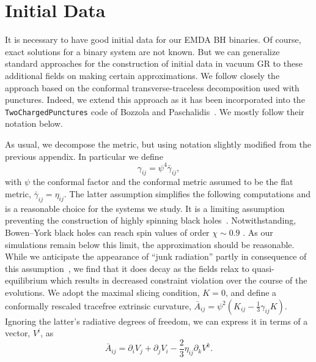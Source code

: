 \section{Initial Data}
\label{sec:appx:id}

It is necessary to have good initial data for our EMDA BH binaries.  Of course, exact solutions for a binary system are not known.  But we can generalize standard approaches for the construction of initial data in vacuum GR to these additional fields on making certain approximations.  We follow closely the approach based on the conformal transverse-traceless decomposition  used with punctures.  Indeed, we extend this approach as it has been incorporated into the {\tt TwoChargedPunctures} code of Bozzola and Paschalidis~\cite{Bozzola2019,ferreira2026electromagneticdualitydegeneracydynamical}.  We mostly follow their notation below.

As usual, we decompose the metric, but using notation slightly modified from the previous appendix.  In particular we define 
\begin{equation}
    \gamma_{ij}= \psi^4 \bar{\gamma}_{ij},
\end{equation}
with $\psi$ the conformal factor and the conformal metric assumed to be the flat metric, ${\bar\gamma}_{ij} = \eta_{ij}$.  The latter assumption simplifies the following computations and is a reasonable choice for the systems we study. It is a limiting assumption preventing the construction of highly spinning black holes~\cite{ValienteKroon2004,Price2000}. 
Notwithstanding, Bowen--York black holes can reach spin values of order $\chi \sim 0.9$ \cite{Dain2002}. As our simulations remain below this limit, the approximation should be reasonable.  
While we anticipate the appearance of ``junk radiation'' partly in consequence of this assumption~\cite{Bozzola2021}, we find that it does decay  
as the fields relax to quasi-equilibrium which results in decreased constraint violation over the course of the evolutions. We adopt the maximal slicing condition, $K=0$, and define a conformally rescaled tracefree extrinsic curvature, ${\bar A}_{ij}=\psi^{2}(K_{ij} - \tfrac{1}{3} \gamma_{ij} K)$.  Ignoring the latter's radiative degrees of freedom, we can express it in terms of a vector, $V^i$, as
\begin{equation}
    \bar{A}_{ij} = \partial_i V_j + \partial_j V_i - \frac{2}{3}\eta_{ij}\partial_k V^k.
\end{equation} 

